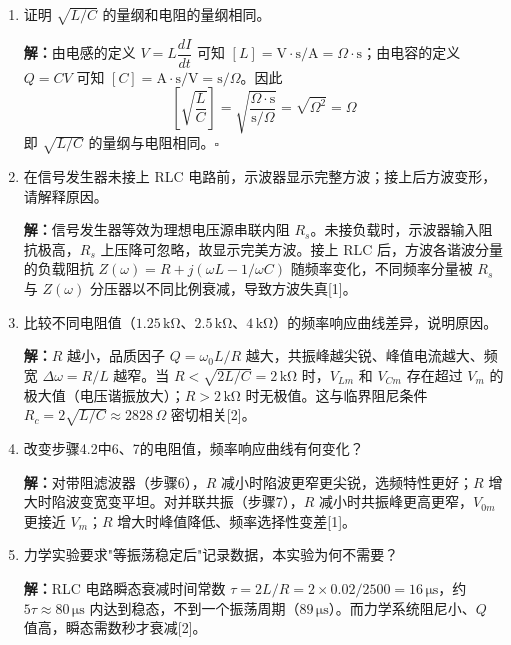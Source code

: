 \documentclass[UTF8]{article}
\begin{document}
\begin{enumerate}
    \item 证明 $\sqrt{L/C}$ 的量纲和电阻的量纲相同。

    \textbf{解：}由电感的定义 $V = L \dfrac{dI}{dt}$ 可知 $[L] = \mathrm{V \cdot s / A} = \Omega \cdot \mathrm{s}$；由电容的定义 $Q = CV$ 可知 $[C] = \mathrm{A \cdot s / V} = \mathrm{s} / \Omega$。因此
    \[
    \left[\sqrt{\frac{L}{C}}\right] = \sqrt{\frac{\Omega \cdot \mathrm{s}}{\mathrm{s}/\Omega}} = \sqrt{\Omega^2} = \Omega
    \]
    即 $\sqrt{L/C}$ 的量纲与电阻相同。$\square$

    \item 在信号发生器未接上 RLC 电路前，示波器显示完整方波；接上后方波变形，请解释原因。

    \textbf{解：}信号发生器等效为理想电压源串联内阻 $R_s$。未接负载时，示波器输入阻抗极高，$R_s$ 上压降可忽略，故显示完美方波。接上 RLC 后，方波各谐波分量的负载阻抗 $Z(\omega) = R + j(\omega L - 1/\omega C)$ 随频率变化，不同频率分量被 $R_s$ 与 $Z(\omega)$ 分压器以不同比例衰减，导致方波失真[1]。

    \item 比较不同电阻值（$1.25\,\mathrm{k\Omega}$、$2.5\,\mathrm{k\Omega}$、$4\,\mathrm{k\Omega}$）的频率响应曲线差异，说明原因。

    \textbf{解：}$R$ 越小，品质因子 $Q = \omega_0 L / R$ 越大，共振峰越尖锐、峰值电流越大、频宽 $\Delta\omega = R/L$ 越窄。当 $R < \sqrt{2L/C} = 2\,\mathrm{k\Omega}$ 时，$V_{Lm}$ 和 $V_{Cm}$ 存在超过 $V_m$ 的极大值（电压谐振放大）；$R > 2\,\mathrm{k\Omega}$ 时无极值。这与临界阻尼条件 $R_c = 2\sqrt{L/C} \approx 2828\,\Omega$ 密切相关[2]。

    \item 改变步骤4.2中6、7的电阻值，频率响应曲线有何变化？

    \textbf{解：}对带阻滤波器（步骤6），$R$ 减小时陷波更窄更尖锐，选频特性更好；$R$ 增大时陷波变宽变平坦。对并联共振（步骤7），$R$ 减小时共振峰更高更窄，$V_{0m}$ 更接近 $V_m$；$R$ 增大时峰值降低、频率选择性变差[1]。

    \item 力学实验要求"等振荡稳定后"记录数据，本实验为何不需要？

    \textbf{解：}RLC 电路瞬态衰减时间常数 $\tau = 2L/R = 2 \times 0.02/2500 = 16\,\mathrm{\mu s}$，约 $5\tau \approx 80\,\mathrm{\mu s}$ 内达到稳态，不到一个振荡周期（$89\,\mathrm{\mu s}$）。而力学系统阻尼小、$Q$ 值高，瞬态需数秒才衰减[2]。
\end{enumerate}
\end{document}
